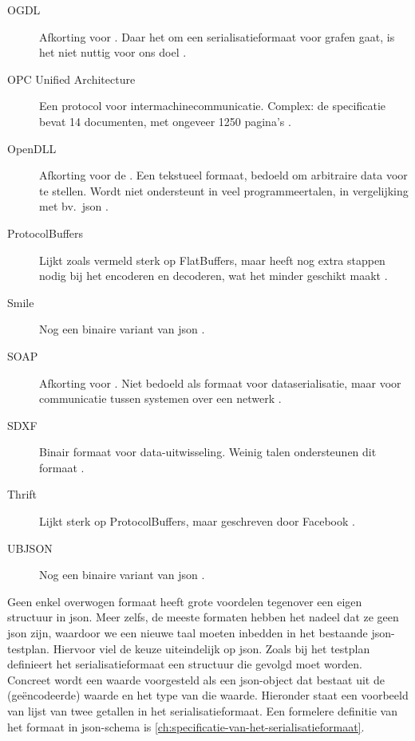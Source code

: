 \begin{description}
    \item[OGDL] Afkorting voor .
    Daar het om een serialisatieformaat voor grafen gaat, is het niet nuttig voor ons doel \autocite{ogdl}.
    \item[OPC Unified Architecture] Een protocol voor intermachinecommunicatie.
    Complex: de specificatie bevat 14 documenten, met ongeveer 1250 pagina's \autocite{tr62541}.
    \item[OpenDLL] Afkorting voor de .
    Een tekstueel formaat, bedoeld om arbitraire data voor te stellen.
    Wordt niet ondersteunt in veel programmeertalen, in vergelijking met bv.\ json \autocite{openddl}.
    \item[ProtocolBuffers] Lijkt zoals vermeld sterk op FlatBuffers, maar heeft nog extra stappen nodig bij het encoderen en decoderen, wat het minder geschikt maakt \autocite{protobuf}.
    \item[Smile] Nog een binaire variant van json \autocite{smile}.
    \item[SOAP] Afkorting voor .
    Niet bedoeld als formaat voor dataserialisatie, maar voor communicatie tussen systemen over een netwerk \autocite{soap}.
    \item[SDXF] Binair formaat voor data-uitwisseling.
    Weinig talen ondersteunen dit formaat \autocite{rfc3072}.
    \item[Thrift] Lijkt sterk op ProtocolBuffers, maar geschreven door Facebook \autocite{slee2007}.
    \item[UBJSON] Nog een binaire variant van json \autocite{ubjson}.

\end{description}

Geen enkel overwogen formaat heeft grote voordelen tegenover een eigen structuur in json.
Meer zelfs, de meeste formaten hebben het nadeel dat ze geen json zijn, waardoor we een nieuwe taal moeten inbedden in het bestaande json-testplan.
Hiervoor viel de keuze uiteindelijk op json.
Zoals bij het testplan definieert het serialisatieformaat een structuur die gevolgd moet worden.
Concreet wordt een waarde voorgesteld als een json-object dat bestaat uit de (geëncodeerde) waarde en het type van die waarde.
Hieronder staat een voorbeeld van lijst van twee getallen in het serialisatieformaat.
Een formelere definitie van het formaat in json-schema is \cref{ch:specificatie-van-het-serialisatieformaat}.

\inputminted{json}{code/format.json}

